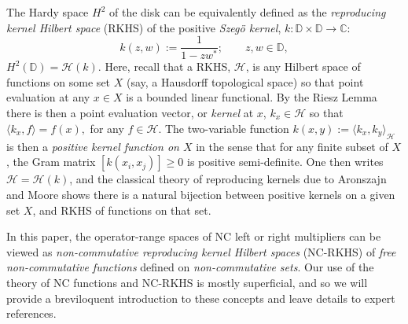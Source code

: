 \documentclass[11pt]{article}
\def\C{\mathbb{C}}
\def\D{\mathbb{D}}
\def\cH{\mathcal{H}}
\newcommand{\ip}[2]{\ensuremath{\langle {#1} , {#2} \rangle}}
\numberwithin{equation}{section}
\numberwithin{subsection}{section}
\theoremstyle{definition}
\begin{document}
The Hardy space $H^2$ of the disk can be equivalently defined as the \emph{reproducing kernel Hilbert space} (RKHS) of the positive \emph{Szeg\"{o} kernel}, $k : \D \times \D \rightarrow \C$: 
$$ k(z,w) := \frac{1}{1-zw^*}; \quad \quad z,w \in \D, $$ $H^2 (\D) = \cH (k)$. Here, recall that a RKHS, $\cH$, is any Hilbert space of functions on some set $X$ (say, a Hausdorff topological space) so that point evaluation at any $x \in X$ is a bounded linear functional. By the Riesz Lemma there is then a point evaluation vector, or \emph{kernel} at $x$, $k_x \in \cH$ so that 
$ \ip{k_x}{f} = f(x), $ for any $f \in \cH$. The two-variable function $k(x,y) := \ip{k_x}{k_y}_\cH$ is then a \emph{positive kernel function on $X$} in the sense that for any finite subset of $X$, the Gram matrix $[ k(x_i , x_j ) ] \geq 0$ is positive semi-definite. One then writes $\cH =\cH (k)$, and the classical theory of reproducing kernels due to Aronszajn and Moore shows there is a natural bijection between positive kernels on a given set $X$, and RKHS of functions on that set.

In this paper, the operator-range spaces of NC left or right multipliers can be viewed as \emph{non-commutative reproducing kernel Hilbert spaces} (NC-RKHS) of \emph{free non-commutative functions} defined on \emph{non-commutative sets}. Our use of the theory of NC functions and NC-RKHS is mostly superficial, and so we will provide a breviloquent introduction to these concepts and leave details to expert references.
\end{document}
